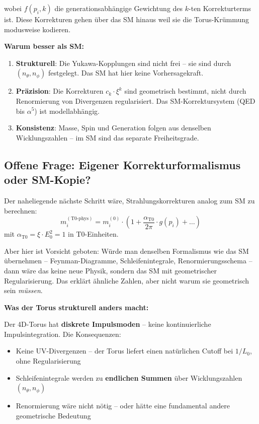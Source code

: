 wobei $f(p_i, k)$ die generationsabhängige Gewichtung des
$k$-ten Korrekturterms ist. Diese Korrekturen gehen über das
SM hinaus weil sie die Torus-Krümmung modusweise kodieren.

\textbf{Warum besser als SM:}
\begin{enumerate}
    \item \textbf{Strukturell}: Die Yukawa-Kopplungen sind nicht
          frei -- sie sind durch $(n_\theta, n_\phi)$ festgelegt.
          Das SM hat hier keine Vorhersagekraft.

    \item \textbf{Präzision}: Die Korrekturen $c_k \cdot \xi^k$
          sind geometrisch bestimmt, nicht durch Renormierung
          von Divergenzen regularisiert. Das SM-Korrektursystem
          (QED bis $\alpha^5$) ist modellabhängig.

    \item \textbf{Konsistenz}: Masse, Spin und Generation folgen
          aus denselben Wicklungszahlen -- im SM sind das
          separate Freiheitsgrade.
\end{enumerate}

\subsection{Offene Frage: Eigener Korrekturformalismus oder SM-Kopie?}

Der naheliegende nächste Schritt wäre, Strahlungskorrekturen analog
zum SM zu berechnen:
\begin{equation}
    m_i^{(\text{T0-phys})} = m_i^{(0)} \cdot
    \left(1 + \frac{\alpha_{\text{T0}}}{2\pi} \cdot g(p_i) + \ldots\right)
\end{equation}
mit $\alpha_{\text{T0}} = \xi \cdot E_0^2 = 1$ in T0-Einheiten.

Aber hier ist Vorsicht geboten: Würde man denselben Formalismus wie
das SM übernehmen -- Feynman-Diagramme, Schleifenintegrale,
Renormierungsschema -- dann wäre das keine neue Physik, sondern
das SM mit geometrischer Regularisierung. Das erklärt ähnliche
Zahlen, aber nicht warum sie geometrisch sein \emph{müssen}.

\textbf{Was der Torus strukturell anders macht:}

Der 4D-Torus hat \textbf{diskrete Impulsmoden} -- keine kontinuierliche
Impulsintegration. Die Konsequenzen:
\begin{itemize}
    \item Keine UV-Divergenzen -- der Torus liefert einen natürlichen
          Cutoff bei $1/L_0$, ohne Regularisierung
    \item Schleifenintegrale werden zu \textbf{endlichen Summen}
          über Wicklungszahlen $(n_\theta, n_\phi)$
    \item Renormierung wäre nicht nötig -- oder hätte eine
          fundamental andere geometrische Bedeutung
\end{itemize}

